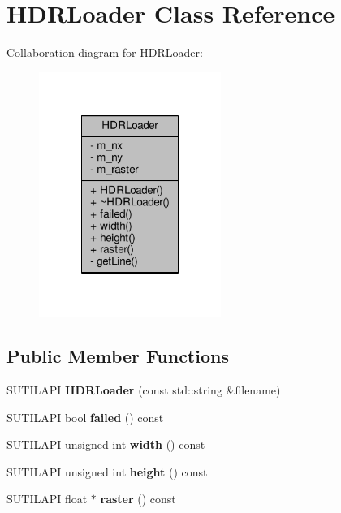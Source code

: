 \hypertarget{class_h_d_r_loader}{\section{H\-D\-R\-Loader Class Reference}
\label{class_h_d_r_loader}
}


Collaboration diagram for H\-D\-R\-Loader\-:
\nopagebreak
\begin{figure}[H]
\begin{center}
\leavevmode
\includegraphics[width=168pt]{class_h_d_r_loader__coll__graph}
\end{center}
\end{figure}
\subsection*{Public Member Functions}
\begin{DoxyCompactItemize}
\item 
\hypertarget{class_h_d_r_loader_a48862ffa3232fa33eb66e678626ecbb3}{S\-U\-T\-I\-L\-A\-P\-I {\bfseries H\-D\-R\-Loader} (const std\-::string \&filename)}\label{class_h_d_r_loader_a48862ffa3232fa33eb66e678626ecbb3}

\item 
\hypertarget{class_h_d_r_loader_a492cd646d50f8091d486ced4da5381a9}{S\-U\-T\-I\-L\-A\-P\-I bool {\bfseries failed} () const }\label{class_h_d_r_loader_a492cd646d50f8091d486ced4da5381a9}

\item 
\hypertarget{class_h_d_r_loader_af515ddb1a7004efaca466613d5ca3a42}{S\-U\-T\-I\-L\-A\-P\-I unsigned int {\bfseries width} () const }\label{class_h_d_r_loader_af515ddb1a7004efaca466613d5ca3a42}

\item 
\hypertarget{class_h_d_r_loader_a05bae772760abfb3809e03509ff93156}{S\-U\-T\-I\-L\-A\-P\-I unsigned int {\bfseries height} () const }\label{class_h_d_r_loader_a05bae772760abfb3809e03509ff93156}

\item 
\hypertarget{class_h_d_r_loader_a7e5196d506b4aee4ecd857c25c742825}{S\-U\-T\-I\-L\-A\-P\-I float $\ast$ {\bfseries raster} () const }\label{class_h_d_r_loader_a7e5196d506b4aee4ecd857c25c742825}

\end{DoxyCompactItemize}
